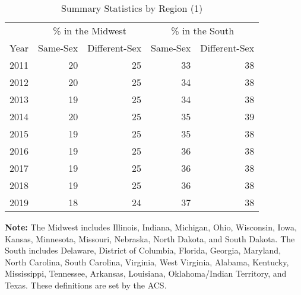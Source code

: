 \begin{table}[htbp]

\caption{Summary Statistics by Region (1)}
\label{region_1} %
\centering
\begin{tabular}[t]{rrrrr}
\toprule
\multicolumn{1}{c}{ } & \multicolumn{2}{c}{\% in the Midwest} & \multicolumn{2}{c}{\% in the South} \\
\cmidrule(l{3pt}r{3pt}){2-3} \cmidrule(l{3pt}r{3pt}){4-5}
Year & Same-Sex & Different-Sex & Same-Sex & Different-Sex\\
\midrule
2011 & 20 & 25 & 33 & 38\\
2012 & 20 & 25 & 34 & 38\\
2013 & 19 & 25 & 34 & 38\\
2014 & 20 & 25 & 35 & 39\\
2015 & 19 & 25 & 35 & 38\\
2016 & 19 & 25 & 36 & 38\\
2017 & 19 & 25 & 36 & 38\\
2018 & 19 & 25 & 36 & 38\\
2019 & 18 & 24 & 37 & 38\\
\bottomrule
\end{tabular}
\vspace{0.5em}
\begin{minipage}{0.85\textwidth} %
\small \textbf{Note:} The Midwest includes Illinois, Indiana, Michigan, Ohio, Wisconsin, Iowa, Kansas, Minnesota, Missouri, Nebraska, North Dakota, and South Dakota. The South includes Delaware, District of Columbia, Florida, Georgia, Maryland, North Carolina, South Carolina, Virginia, West Virginia, Alabama, Kentucky, Mississippi, Tennessee, Arkansas, Louisiana, Oklahoma/Indian Territory, and Texas. These definitions are set by the ACS.
\end{minipage}
\end{table}
